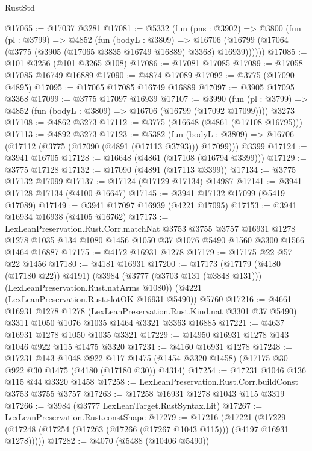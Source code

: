 \begin{lexlean}{RustStd}
\begin{coremodule}
@17065 := @17037 @3281
@17081 := @5332
    (fun (pns : @3902) =>
    @3800
      (fun (pl : @3799) =>
      @4852
        (fun (bodyL : @3809) =>
        @16706 (@16799 (@17064 (@3775 (@3905 (@17065 @3835 @16749 @16889) @3368) @16939))))))
@17085 := @101 @3256 (@101 @3265 @108)
@17086 := @17081 @17085
@17089 := @17058 @17085 @16749 @16889
@17090 := @4874 @17089
@17092 := @3775 (@17090 @4895)
@17095 := @17065 @17085 @16749 @16889
@17097 := @3905 @17095 @3368
@17099 := @3775 @17097 @16939
@17107 := @3990
    (fun (pl : @3799) => @4852 (fun (bodyL : @3809) => @16706 (@16799 (@17092 @17099))))
    @3273
@17108 := @4862 @3273
@17112 := @3775 (@16648 (@4861 (@17108 @16795)))
@17113 := @4892 @3273
@17123 := @5382
    (fun (bodyL : @3809) => @16706 (@17112 (@3775 (@17090 (@4891 (@17113 @3793))) @17099)))
    @3399
@17124 := @3941 @16705
@17128 := @16648 (@4861 (@17108 (@16794 @3399)))
@17129 := @3775 @17128
@17132 := @17090 (@4891 (@17113 @3399))
@17134 := @3775 @17132 @17099
@17137 := @17124 (@17129 @17134) @14987
@17141 := @3941 @17128 @17134 (@4100 @16647)
@17145 := @3941 @17132 @17099 (@5419 @17089)
@17149 := @3941 @17097 @16939 (@4221 @17095)
@17153 := @3941 @16934 @16938 (@4105 @16762)
@17173 := LexLeanPreservation.Rust.Corr.matchNat
    @3753
    @3755
    @3757
    @16931
    @1278
    @1278
    @1035
    @134
    @1080
    @1456
    @1050
    @37
    @1076
    @5490
    @1560
    @3300
    @1566
    @1464
    @16887
@17175 := @4172 @16931 @1278
@17179 := @17175 @22 @57 @22 @1456
@17180 := @4181 @16931
@17200 := @17173
    (@17179 (@4180 (@17180 @22)) @4191)
    (@3984 (@3777 (@3703 @131 (@3848 @131))) (LexLeanPreservation.Rust.natArms @1080))
    (@4221 (LexLeanPreservation.Rust.slotOK @16931 @5490))
    @5760
@17216 := @4661
    @16931
    @1278
    @1278
    (LexLeanPreservation.Rust.Kind.nat @3301 @37 @5490)
    @3311
    @1050
    @1076
    @1035
    @1464
    @3321
    @3363
    @16885
@17221 := @4637 @16931 @1278 @1050 @1035 @3321
@17229 := @14950 @16931 @1278 @143 @1046 @922 @115 @1475 @3320
@17231 := @4160 @16931 @1278
@17248 := @17231
    @143
    @1048
    @922
    @117
    @1475
    (@1454 @3320 @1458)
    (@17175 @30 @922 @30 @1475 (@4180 (@17180 @30)) @4314)
@17254 := @17231 @1046 @136 @115 @44 @3320 @1458
@17258 := LexLeanPreservation.Rust.Corr.buildConst @3753 @3755 @3757
@17263 := @17258 @16931 @1278 @1043 @115 @3319
@17266 := @3984 (@3777 LexLeanTarget.RustSyntax.Lit)
@17267 := LexLeanPreservation.Rust.constShape
@17279 := @17216
    (@17221 (@17229 (@17248 (@17254 (@17263 (@17266 (@17267 @1043 @115))) (@4197 @16931 @1278)))))
@17282 := @4070 (@5488 (@10406 @5490))

\end{coremodule}
\end{lexlean}

